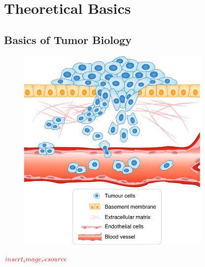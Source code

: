 \section{Theoretical Basics}
\subsection{Basics of Tumor Biology}
\begin{figure}[h]
    \centering
    \includegraphics[width=0.85\textwidth]{resources/images/tumour_invasion_stage.png}
    \label{fig:tumour_invasion_stage}
\end{figure}

$\textcolor{red}{insert_image_resource}$

